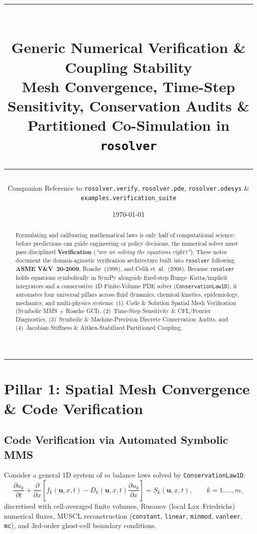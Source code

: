 \documentclass[11pt,a4paper]{article}
\title{
  {\color{navy}\rule{\textwidth}{1.8pt}}\\[0.6em]
  {\LARGE\bfseries\color{navy} Generic Numerical Verification \& Coupling Stability}\\[0.3em]
  {\large\color{slate} Mesh Convergence, Time-Step Sensitivity, Conservation Audits \& Partitioned Co-Simulation in \texttt{rosolver}}\\[0.4em]
  {\color{navy}\rule{\textwidth}{0.8pt}}
}
\author{Companion Reference to \texttt{rosolver.verify}, \texttt{rosolver.pde}, \texttt{rosolver.odesys} \& \texttt{examples.verification\_suite}}
\date{\today}
\newcommand{\pd}[2]{\frac{\partial #1}{\partial #2}}
\begin{document}
\maketitle

\begin{abstract}
\noindent Formulating and calibrating mathematical laws is only half of computational science; before predictions can guide engineering or policy decisions, the numerical solver must pass disciplined \textbf{Verification} (\emph{``are we solving the equations right?''}). These notes document the domain-agnostic verification architecture built into \texttt{rosolver} following \textbf{ASME V\&V~20-2009}, Roache~(1998), and Celik et~al.~(2008). Because \texttt{rosolver} holds equations symbolically in SymPy alongside fixed-step Runge--Kutta/implicit integrators and a conservative 1D Finite-Volume PDE solver (\texttt{ConservationLaw1D}), it automates four universal pillars across fluid dynamics, chemical kinetics, epidemiology, mechanics, and multi-physics systems: (1)~Code \& Solution Spatial Mesh Verification (Symbolic MMS + Roache GCI), (2)~Time-Step Sensitivity \& CFL/Fourier Diagnostics, (3)~Symbolic \& Machine-Precision Discrete Conservation Audits, and (4)~Jacobian Stiffness \& Aitken-Stabilized Partitioned Coupling.
\end{abstract}

\tableofcontents
\vspace{0.8em}
\hrule
\vspace{1em}

\section{Pillar 1: Spatial Mesh Convergence \& Code Verification}

\subsection{Code Verification via Automated Symbolic MMS}
Consider a general 1D system of $m$ balance laws solved by \texttt{ConservationLaw1D}:
\begin{equation}
  \pd{u_k}{t} + \pd{}{x}\!\left[f_k(\mathbf{u}, x, t) - D_k(\mathbf{u}, x, t)\pd{u_k}{x}\right] = S_k(\mathbf{u}, x, t),
  \qquad k = 1,\dots,m,
\end{equation}
discretised with cell-averaged finite volumes, Rusanov (local Lax--Friedrichs) numerical fluxes, MUSCL reconstruction (\texttt{constant}, \texttt{linear}, \texttt{minmod}, \texttt{vanleer}, \texttt{mc}), and 3rd-order ghost-cell boundary conditions.
\end{document}
